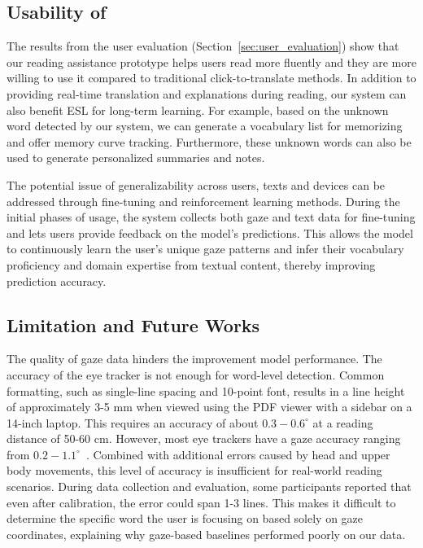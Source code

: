 \subsection{Usability of \name{}}
\label{sec:discuss_usability}
The results from the user evaluation (Section~\ref{sec:user_evaluation}) show that our reading assistance prototype helps users read more fluently and they are more willing to use it compared to traditional click-to-translate methods. In addition to providing real-time translation and explanations during reading, our system can also benefit ESL for long-term learning. For example, based on the unknown word detected by our system, we can generate a vocabulary list for memorizing and offer memory curve tracking. Furthermore, these unknown words can also be used to generate personalized summaries and notes.

The potential issue of generalizability across users, texts and devices can be addressed through fine-tuning and reinforcement learning methods. During the initial phases of usage, the system collects both gaze and text data for fine-tuning and lets users provide feedback on the model's predictions. This allows the model to continuously learn the user's unique gaze patterns and infer their vocabulary proficiency and domain expertise from textual content, thereby improving prediction accuracy.

\subsection{Limitation and Future Works}
\label{sec:discuss_limitation}
The quality of gaze data hinders the improvement model performance. The accuracy of the eye tracker is not enough for word-level detection. Common formatting, such as single-line spacing and 10-point font, results in a line height of approximately 3-5 mm when viewed using the PDF viewer with a sidebar on a 14-inch laptop. This requires an accuracy of about $0.3-0.6^\circ$ at a reading distance of 50-60 cm. However, most eye trackers have a gaze accuracy ranging from $0.2-1.1^\circ$~\cite{gaze_survey_2024}. Combined with additional errors caused by head and upper body movements, this level of accuracy is insufficient for real-world reading scenarios. During data collection and evaluation, some participants reported that even after calibration, the error could span 1-3 lines. This makes it difficult to determine the specific word the user is focusing on based solely on gaze coordinates, explaining why gaze-based baselines performed poorly on our data.

